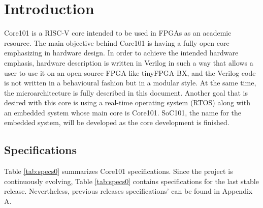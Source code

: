 \documentclass{article}
\begin{document}
\begin{titlepage}
\end{titlepage}

\tableofcontents

\listoffigures

\listoftables

\newpage
\section{Introduction}
Core101 is a RISC-V core intended to be used in FPGAs as an academic resource. The main objective behind Core101 is having a fully open core emphasizing in hardware design. In order to achieve the intended hardware emphasis, hardware description is written in Verilog in such a way that allows a user to use it on an open-source FPGA like tinyFPGA-BX, and the Verilog code is not written in a behavioural fashion but in a modular style. At the same time, the microarchitecture is fully described in this document. Another goal that is desired with this core is using a real-time operating system (RTOS) along with an embedded system whose main core is Core101. SoC101, the name for the embedded system, will be developed as the core development is finished.

\subsection{Specifications}
Table \ref{tab:specs0} summarizes Core101 specifications. Since the project is continuously evolving, Table \ref{tab:specs0} contains specifications for the last stable release. Nevertheless, previous releases specifications' can be found in Appendix A.
\end{document}
